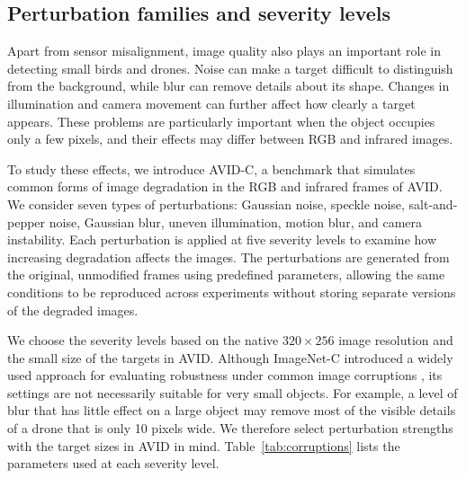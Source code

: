 \documentclass[10pt]{article}
\newcommand{\dataset}{\textsc{AVID}}
\newcommand{\corrupt}{\textsc{AVID-C}}
\begin{document}
\subsection{Perturbation families and severity levels}

Apart from sensor misalignment, image quality also plays an important role in detecting small birds and drones. Noise can make a target difficult to distinguish from the background, while blur can remove details about its shape. Changes in illumination and camera movement can further affect how clearly a target appears. These problems are particularly important when the object occupies only a few pixels, and their effects may differ between RGB and infrared images.

To study these effects, we introduce \corrupt{}, a benchmark that simulates common forms of image degradation in the RGB and infrared frames of \dataset{}. We consider seven types of perturbations: Gaussian noise, speckle noise, salt-and-pepper noise, Gaussian blur, uneven illumination, motion blur, and camera instability. Each perturbation is applied at five severity levels to examine how increasing degradation affects the images. The perturbations are generated from the original, unmodified frames using predefined parameters, allowing the same conditions to be reproduced across experiments without storing separate versions of the degraded images.

We choose the severity levels based on the native $320\times256$ image resolution and the small size of the targets in \dataset{}. Although ImageNet-C introduced a widely used approach for evaluating robustness under common image corruptions \citep{hendrycks2019benchmarking}, its settings are not necessarily suitable for very small objects. For example, a level of blur that has little effect on a large object may remove most of the visible details of a drone that is only 10 pixels wide. We therefore select perturbation strengths with the target sizes in \dataset{} in mind. Table~\ref{tab:corruptions} lists the parameters used at each severity level.
\end{document}
